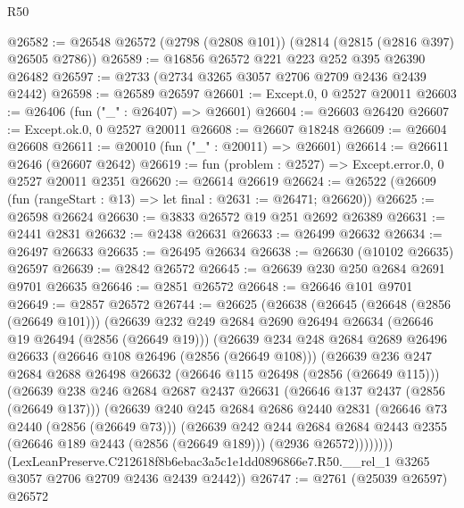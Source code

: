 \begin{lexlean}{R50}
\begin{coremodule}
@26582 := @26548 @26572 (@2798 (@2808 @101)) (@2814 (@2815 (@2816 @397) @26505 @2786))
@26589 := @16856 @26572 @221 @223 @252 @395 @26390 @26482
@26597 := @2733 (@2734 @3265 @3057 @2706 @2709 @2436 @2439 @2442)
@26598 := @26589 @26597
@26601 := Except.{0, 0} @2527 @20011
@26603 := @26406 (fun ("_" : @26407) => @26601)
@26604 := @26603 @26420
@26607 := Except.ok.{0, 0} @2527 @20011
@26608 := @26607 @18248
@26609 := @26604 @26608
@26611 := @20010 (fun ("_" : @20011) => @26601)
@26614 := @26611 @2646 (@26607 @2642)
@26619 := fun (problem : @2527) => Except.error.{0, 0} @2527 @20011 @2351
@26620 := @26614 @26619
@26624 := @26522 (@26609 (fun (rangeStart : @13) => let final : @2631 := @26471; @26620))
@26625 := @26598 @26624
@26630 := @3833 @26572 @19 @251 @2692 @26389
@26631 := @2441 @2831
@26632 := @2438 @26631
@26633 := @26499 @26632
@26634 := @26497 @26633
@26635 := @26495 @26634
@26638 := @26630 (@10102 @26635) @26597
@26639 := @2842 @26572
@26645 := @26639 @230 @250 @2684 @2691 @9701 @26635
@26646 := @2851 @26572
@26648 := @26646 @101 @9701
@26649 := @2857 @26572
@26744 := @26625
    (@26638
      (@26645
        (@26648 (@2856 (@26649 @101)))
        (@26639
          @232
          @249
          @2684
          @2690
          @26494
          @26634
          (@26646 @19 @26494 (@2856 (@26649 @19)))
          (@26639
            @234
            @248
            @2684
            @2689
            @26496
            @26633
            (@26646 @108 @26496 (@2856 (@26649 @108)))
            (@26639
              @236
              @247
              @2684
              @2688
              @26498
              @26632
              (@26646 @115 @26498 (@2856 (@26649 @115)))
              (@26639
                @238
                @246
                @2684
                @2687
                @2437
                @26631
                (@26646 @137 @2437 (@2856 (@26649 @137)))
                (@26639
                  @240
                  @245
                  @2684
                  @2686
                  @2440
                  @2831
                  (@26646 @73 @2440 (@2856 (@26649 @73)))
                  (@26639
                    @242
                    @244
                    @2684
                    @2684
                    @2443
                    @2355
                    (@26646 @189 @2443 (@2856 (@26649 @189)))
                    (@2936 @26572))))))))
      (LexLeanPreserve.C212618f8b6ebac3a5c1e1dd0896866e7.R50.__rel_1
        @3265
        @3057
        @2706
        @2709
        @2436
        @2439
        @2442))
@26747 := @2761 (@25039 @26597) @26572

\end{coremodule}
\end{lexlean}
